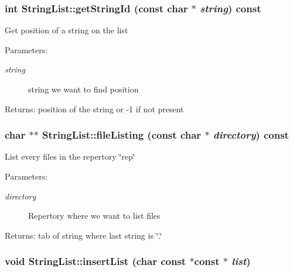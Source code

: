 \subsubsection{\setlength{\rightskip}{0pt plus 5cm}int StringList::getStringId (const char $\ast$ {\em string}) const}\label{classStringList_e07361dc2b7266323eb2e3f5f326b471}


Get position of a string on the list \begin{Desc}
\item[Parameters:]
\begin{description}
\item[{\em string}]string we want to find position \end{description}
\end{Desc}
\begin{Desc}
\item[Returns:]position of the string or -1 if not present \end{Desc}
\subsubsection{\setlength{\rightskip}{0pt plus 5cm}char $\ast$$\ast$ StringList::fileListing (const char $\ast$ {\em directory}) const\hspace{0.3cm}{\tt  [protected]}}\label{classStringList_0b29c0588b3e902d2c621e4d8ac749e7}


List every files in the repertory \char`\"{}rep\char`\"{} \begin{Desc}
\item[Parameters:]
\begin{description}
\item[{\em directory}]Repertory where we want to list files \end{description}
\end{Desc}
\begin{Desc}
\item[Returns:]tab of string where last string is \char`\"{}.\char`\"{} \end{Desc}
\subsubsection{\setlength{\rightskip}{0pt plus 5cm}void StringList::insertList (char const $\ast$const $\ast$ {\em list})\hspace{0.3cm}{\tt  [protected]}}\label{classStringList_77d8eb8324bbb4c49a215793325ad299}


